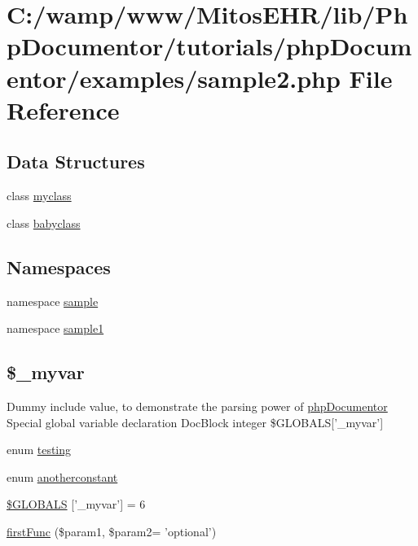 \hypertarget{sample2_8php}{\section{\-C\-:/wamp/www/\-Mitos\-E\-H\-R/lib/\-Php\-Documentor/tutorials/php\-Documentor/examples/sample2.php \-File \-Reference}
\label{sample2_8php}
}
\subsection*{\-Data \-Structures}
\begin{DoxyCompactItemize}
\item 
class \hyperlink{classmyclass}{myclass}
\item 
class \hyperlink{classbabyclass}{babyclass}
\end{DoxyCompactItemize}
\subsection*{\-Namespaces}
\begin{DoxyCompactItemize}
\item 
namespace \hyperlink{namespacesample}{sample}
\item 
namespace \hyperlink{namespacesample1}{sample1}
\end{DoxyCompactItemize}
\subsection*{\$\-\_\-myvar}
\label{_amgrp5bbc7a3607925be7bacf9f84177a3028}%
 \-Dummy include value, to demonstrate the parsing power of \hyperlink{namespacephp_documentor}{php\-Documentor} \-Special global variable declaration \-Doc\-Block  integer \$\-G\-L\-O\-B\-A\-L\-S\mbox{[}'\-\_\-myvar'\mbox{]} \begin{DoxyCompactItemize}
\item 
enum \hyperlink{sample2_8php_ac82209ce53117ea2ba2b79898a0ee1ac}{testing} 
\item 
enum \hyperlink{sample2_8php_a17394f69f82ef325519c9b555be51022}{anotherconstant} 
\item 
\hyperlink{sample2_8php_af57fd0dc3f93457714d80dc8f32477a3}{\$\-G\-L\-O\-B\-A\-L\-S} \mbox{[}'\-\_\-myvar'\mbox{]} = 6
\item 
\hyperlink{sample2_8php_a940871f540cce07fe3de81b5b43dc8df}{first\-Func} (\$param1, \$param2= 'optional')
\end{DoxyCompactItemize}


